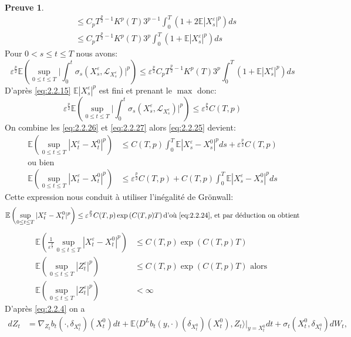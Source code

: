 \documentclass[12pt,a4paper,twoside,fleqn]{book}%
\theoremstyle{definition}
\newtheorem*{pr}{\textbf{Preuve}}
\theoremstyle{lemme}
\numberwithin{equation}{section}
\begin{document}
\begin{pr}
\[\begin{aligned}
&\leq C_pT^{\frac{p}{2}-1}K^p(T)3^{p-1}\int_{0}^{T}\left(1 + 2\mathbb{E}|X_s^\varepsilon|^p\right)ds\\
&\leq C_pT^{\frac{p}{2}-1}K^p(T)3^p \int_{0}^{T}(1 + \mathbb{E}|X_s^\varepsilon|^p)ds
\end{aligned}
\]
Pour $0< s \leq t\leq T$ nous avons:
\[
	\varepsilon^{\frac{p}{2}}\mathbb{E}\left(\sup_{0\leq t \leq T}\Big|\int_{0}^{t}\sigma_s(X_s^\varepsilon,\mathcal{L}_{X_s^\varepsilon})\Big|^p\right)\leq \varepsilon^{\frac{p}{2}}C_pT^{\frac{p}{2}-1}K^p(T)3^p\int_{0}^{T}(1+\mathbb{E}|X_s^\varepsilon|^p)ds
\]
D'après \ref{eq:2.2.15} $\mathbb{E}|X_s^\varepsilon|^p$ est fini et prenant le $\max$ donc:
\begin{equation}\label{eq:2.2.27}
		\varepsilon^{\frac{p}{2}}\mathbb{E}\left(\sup_{0\leq t \leq T}\Big|\int_{0}^{t}\sigma_s(X_s^\varepsilon,\mathcal{L}_{X_s^\varepsilon})\Big|^p\right)\leq \varepsilon^{\frac{p}{2}}C(T,p)
\end{equation}
On combine les \ref{eq:2.2.26} et \ref{eq:2.2.27} alors \ref{eq:2.2.25} devient:
\[
\begin{aligned}
\mathbb{E}\left(\sup_{0\leq t \leq T} |X_t^\varepsilon - X_t^0|^p\right)&\leq C(T,p)\int_{0}^{T}\mathbb{E}|X_s^\varepsilon-X_s^0|^p ds + \varepsilon^{\frac{p}{2}}C(T,p)\\
\text{ou bien}\\
\mathbb{E}\left(\sup_{0\leq t \leq T} |X_t^\varepsilon - X_t^0|^p\right)&\leq \varepsilon^{\frac{p}{2}}C(T,p) + C(T,p)\int_{0}^{T}\mathbb{E}|X_s^\varepsilon-X_s^0|^p ds
\end{aligned}
\]
Cette expression nous conduit à utiliser l’inégalité de Grönwall:
\[
\mathbb{E}\left(\sup_{0\leq t \leq T} |X_t^\varepsilon - X_t^0|^p\right)\leq \varepsilon^{\frac{p}{2}}C(T,p)\exp\left(C(T,p)T\right) \text{d'où \ref{eq:2.2.24}, et par déduction on obtient}
\]
\[
\begin{aligned}
\mathbb{E}\left(\frac{1}{\varepsilon^{\frac{p}{2}}}\sup_{0\leq t \leq T}|X_t^\varepsilon-X_t^0|^p\right)&\leq C(T,p)\exp\left(C(T,p)T\right)\\
\mathbb{E}\left(\sup_{0\leq t \leq T}|Z_t^\varepsilon|^p\right)&\leq C(T,p)\exp\left(C(T,p)T\right) \text{ alors }\\
\mathbb{E}\left(\sup_{0\leq t \leq T}|Z_t^\varepsilon|^p\right)&<\infty
\end{aligned}
\]
D'après \ref{eq:2.2.4} on a\[\begin{aligned}
dZ_t &= \nabla_{Z_t} b_t (\cdot, \delta_{X_t^0}) (X_t^0) dt + \mathbb{E} \langle D^L b_t (y, \cdot) (\delta_{X_t^0}) (X_t^0), Z_t\rangle |_{y = X_t^0} dt + \sigma_t (X_t^0, \delta_{X_t^0}) dW_t, %

\end{aligned}\]
\end{pr}
\end{document}
